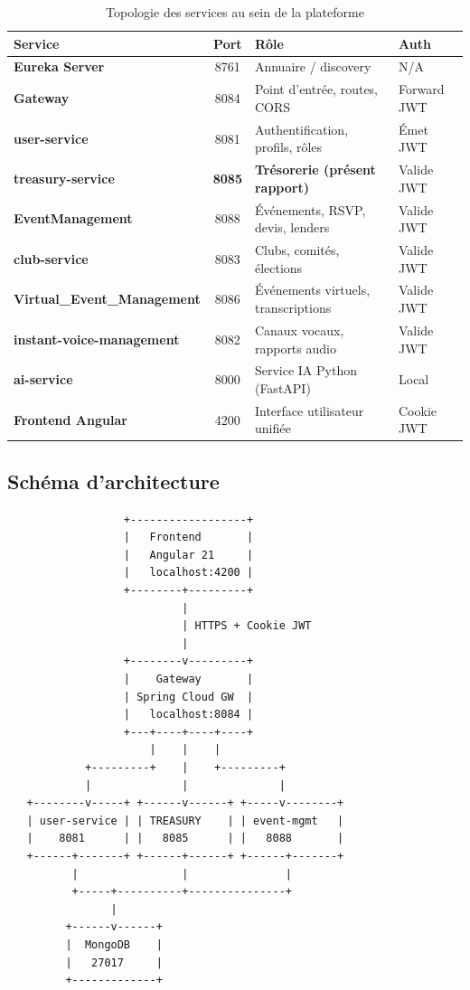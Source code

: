 \documentclass[11pt,a4paper]{article}
\begin{document}
\begin{table}[h]
  \centering
  \small
  \begin{tabularx}{\linewidth}{>{\bfseries}lcXX}
    \toprule
    Service & Port & Rôle & Auth \\
    \midrule
    Eureka Server                & 8761 & Annuaire / discovery & N/A \\
    Gateway                      & 8084 & Point d'entrée, routes, CORS & Forward JWT \\
    user-service                 & 8081 & Authentification, profils, rôles & Émet JWT \\
    \textbf{treasury-service}    & \textbf{8085} & \textbf{Trésorerie (présent rapport)} & Valide JWT \\
    EventManagement              & 8088 & Événements, RSVP, devis, lenders & Valide JWT \\
    club-service                 & 8083 & Clubs, comités, élections & Valide JWT \\
    Virtual\_Event\_Management   & 8086 & Événements virtuels, transcriptions & Valide JWT \\
    instant-voice-management     & 8082 & Canaux vocaux, rapports audio & Valide JWT \\
    ai-service                   & 8000 & Service IA Python (FastAPI) & Local \\
    Frontend Angular             & 4200 & Interface utilisateur unifiée & Cookie JWT \\
    \bottomrule
  \end{tabularx}
  \caption{Topologie des services au sein de la plateforme}
\end{table}

\subsection{Schéma d'architecture}

\begin{verbatim}
                  +------------------+
                  |   Frontend       |
                  |   Angular 21     |
                  |   localhost:4200 |
                  +--------+---------+
                           |
                           | HTTPS + Cookie JWT
                           |
                  +--------v---------+
                  |    Gateway       |
                  | Spring Cloud GW  |
                  |   localhost:8084 |
                  +---+----+----+----+
                      |    |    |
            +---------+    |    +---------+
            |              |              |
   +--------v-----+ +------v------+ +-----v--------+
   | user-service | | TREASURY    | | event-mgmt   |
   |    8081      | |   8085      | |   8088       |
   +------+-------+ +------+------+ +------+-------+
          |                |               |
          +-----+----------+---------------+
                |
         +------v------+
         |  MongoDB    |
         |   27017     |
         +-------------+
\end{verbatim}
\end{document}
